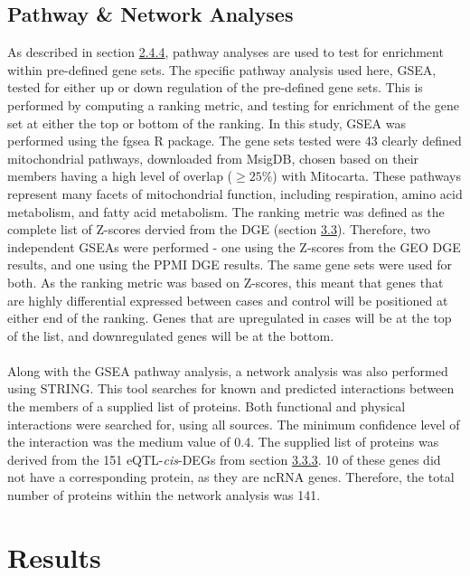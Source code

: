 \documentclass{article}
\begin{document}
\subsection{Pathway \& Network Analyses}
\label{subsec:pathways}
As described in section \hyperref[subsubsec:pathwaysandnetworks]{2.4.4}, pathway analyses are used to test for enrichment within pre-defined gene sets. The specific pathway analysis used here, GSEA, tested for either up or down regulation of the pre-defined gene sets. This is performed by computing a ranking metric, and testing for enrichment of the gene set at either the top or bottom of the ranking. In this study, GSEA was performed using the fgsea\cite{KorotkevichG2019FastAnalysis} R package. The gene sets tested were 43 clearly defined mitochondrial pathways, downloaded from MsigDB\cite{Liberzon2011Molecular3.0}, chosen based on their members having a high level of overlap ($\geq25\%$) with Mitocarta\cite{Rath2021MitoCarta3.0:Annotations}. These pathways represent many facets of mitochondrial function, including respiration, amino acid metabolism, and fatty acid metabolism. The ranking metric was defined as the complete list of Z-scores dervied from the DGE (section \hyperref[subsec:validation]{3.3}). Therefore, two independent GSEAs were performed - one using the Z-scores from the GEO DGE results, and one using the PPMI DGE results. The same gene sets were used for both. As the ranking metric was based on Z-scores, this meant that genes that are highly differential expressed between cases and control will be positioned at either end of the ranking. Genes that are upregulated in cases will be at the top of the list, and downregulated genes will be at the bottom. 
\\
\\Along with the GSEA pathway analysis, a network analysis was also performed using STRING\cite{Szklarczyk2023TheInterest}. This tool searches for known and predicted interactions between the members of a supplied list of proteins. Both functional and physical interactions were searched for, using all sources. The minimum confidence level of the interaction was the medium value of 0.4. The supplied list of proteins was derived from the 151 eQTL-\textit{cis}-DEGs from section \hyperref[subsec:validation]{3.3.3}. 10 of these genes did not have a corresponding protein, as they are ncRNA genes. Therefore, the total number of proteins within the network analysis was 141.
\newpage
\section{Results}
\end{document}
